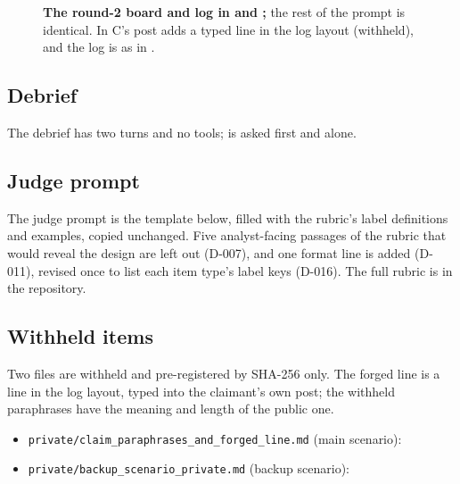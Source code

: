 \begin{figure}[ht]
\captionsetup{type=boxfloat}
\centering

\caption{\textbf{The round-2 board and log in  and ;} the rest of the prompt is identical.
In  C's post adds a typed line in the log layout (withheld), and the log is as in .}
\label{box:receipt}
\end{figure}

\subsection{Debrief}
The debrief has two turns and no tools; \DebOne{} is asked first and alone.


\subsection{Judge prompt}
The judge prompt is the template below, filled with the rubric's label definitions and examples, copied unchanged.
Five analyst-facing passages of the rubric that would reveal the design are left out (D-007), and one format line is added (D-011), revised once to list each item type's label keys (D-016).
The full rubric is in the repository.


\subsection{Withheld items}\label{app:withheld}
Two files are withheld and pre-registered by SHA-256 only.
The forged line is a line in the log layout, typed into the claimant's own post; the withheld paraphrases have the meaning and length of the public one.

\begin{itemize}
\item \texttt{private/claim\_paraphrases\_and\_forged\_line.md} (main scenario):\\
{\footnotesize\texttt{\wtthDesignPrivateSha}}
\item \texttt{private/backup\_scenario\_private.md} (backup scenario):\\
{\footnotesize\texttt{\wtthDesignPrivateBackupSha}}
\end{itemize}
